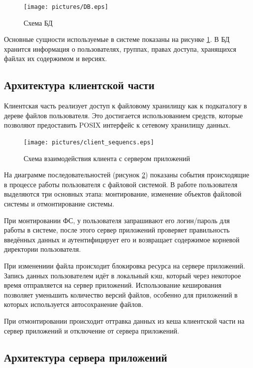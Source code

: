 \documentclass[utf8,usehyperref,12pt]{G7-32}
\begin{document}
\begin{figure}[ht]
   \centering%
   \texttt{[image: pictures/DB.eps]}
   \caption{Схема БД}\label{fig:db_scheme}
 \end{figure}

Основные сущности используемые в системе показаны на рисунке \ref{fig:db_scheme}. В БД хранится информация о пользователях, группах, правах доступа, хранящихся файлах их содержимом и версиях.
 
\subsection{Архитектура клиентской части}

Клиентская часть реализует доступ к файловому хранилищу как к подкаталогу в дереве файлов пользователя. Это достигается использованием средств, которые позволяют предоставить POSIX интерфейс к сетевому хранилищу данных.

\begin{figure}[ht]
   \centering%
   \texttt{[image: pictures/client\_sequencs.eps]}
   \caption{Схема взаимодействия клиента с сервером приложений}\label{fig:client_sequence}
 \end{figure}

На диаграмме последовательностей (рисунок \ref{fig:client_sequence}) показаны события происходящие в процессе работы пользователя с файловой системой. В работе пользователя выделяются три основных этапа: монтирование, изменение объектов файловой системы и отмонтирование системы. 

При монтировании ФС, у пользователя запрашивают его логин/пароль для работы в системе, после этого сервер приложений проверяет правильность введённых данных и аутентифицирует его и возвращает содержимое корневой директории пользователя.

При изменениии файла происходит блокировка ресурса на сервере приложений. Запись данных пользователем идёт в локальный кэш, который через некоторое время отправляется на сервер приложений. Использование кеширования позволяет уменьшить количество версий файлов, особенно для приложений в которых используется автосохранение файлов.

При отмонтировании происходит оттравка данных из кеша клиентской части на сервер приложений и отключение от сервера приложений.

\subsection{Архитектура сервера приложений}
\end{document}
